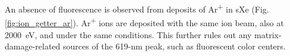 \documentclass[aps,pra,reprint,superscriptaddress]{revtex4-1}
\begin{document}
An absence of fluorescence is observed from deposits of Ar\textsuperscript{+} in sXe (Fig. \ref{fig:ion_getter_ar}).  Ar\textsuperscript{+} ions are deposited with the same ion beam, also at 2000~eV, and under the same conditions.  This further rules out any matrix-damage-related sources of the 619-nm peak, such as fluorescent color centers.






\end{document}
